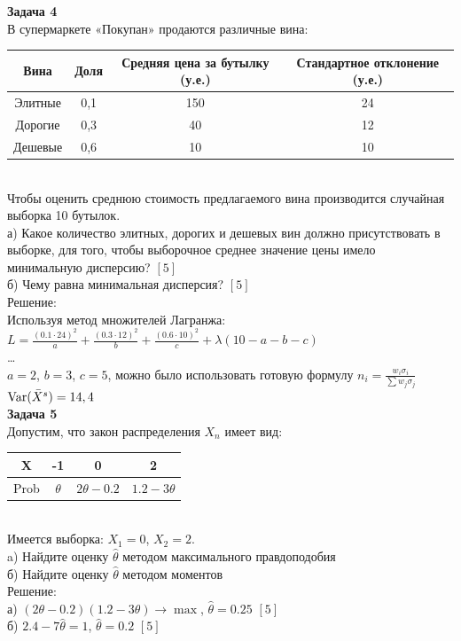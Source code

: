 \documentclass[12pt, a4paper]{article}\usepackage[]{graphicx}\usepackage[]{color}
\begin{document}
\textbf{Задача 4} \\ %
В супермаркете «Покупан» продаются различные вина: \\
\begin{tabular}{|c|c|c|c|}
  \hline
  Вина & Доля & Средняя цена за бутылку (у.е.) & Стандартное отклонение (у.е.) \\
  \hline
  Элитные & 0,1 & 150 & 24 \\
  Дорогие & 0,3 & 40 & 12 \\
  Дешевые & 0,6 & 10 & 10 \\
  \hline
\end{tabular} \\
Чтобы оценить среднюю стоимость предлагаемого вина производится
случайная выборка 10 бутылок. \\
а) Какое количество элитных, дорогих и дешевых вин должно
присутствовать в выборке, для того, чтобы выборочное среднее
значение цены имело минимальную дисперсию? $[5]$ \\
б) Чему равна минимальная дисперсия? $[5]$ \\
Решение: \\
Используя метод множителей Лагранжа: \\
$L=\frac{(0.1\cdot 24)^{2}}{a}+\frac{(0.3\cdot
12)^{2}}{b}+\frac{(0.6\cdot 10)^{2}}{c}+\lambda(10-a-b-c)$\\
\ldots \\
$a=2$, $b=3$, $c=5$, можно было использовать готовую формулу
$n_{i}=\frac{w_{i}\sigma_{i}}{\sum w_{j}\sigma_{j}}$ \\
$\operatorname{Var}(\bar{X}^{s})=14,4$ \\



\textbf{Задача 5} \\ %
Допустим, что закон распределения $X_{n}$ имеет вид: \\
\begin{tabular}{|c|c|c|c|}
  \hline
  X & -1 & 0 & 2 \\
  \hline
  Prob & $\theta$ & $2\theta-0.2$ & $1.2-3\theta$ \\
  \hline
\end{tabular} \\
Имеется выборка: $X_{1}=0$, $X_{2}=2$. \\
a) Найдите оценку $\hat{\theta}$ методом максимального правдоподобия \\
б) Найдите оценку $\hat{\theta}$ методом моментов \\
Решение: \\
а) $(2\theta-0.2)(1.2-3\theta)\rightarrow\max$,
$\hat{\theta}=0.25$ $[5]$\\
б) $2.4-7\hat{\theta}=1$, $\hat{\theta}=0.2$ $[5]$\\
\end{document}
